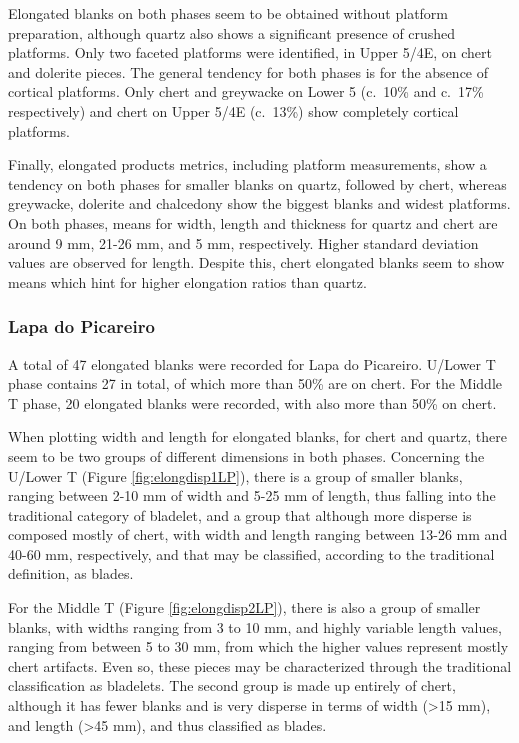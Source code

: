 \documentclass[12pt,twoside]{reedthesis}
\begin{document}
Elongated blanks on both phases seem to be obtained without platform preparation, although quartz also shows a significant presence of crushed platforms. Only two faceted platforms were identified, in Upper 5/4E, on chert and dolerite pieces. The general tendency for both phases is for the absence of cortical platforms. Only chert and greywacke on Lower 5 (c.~10\% and c.~17\% respectively) and chert on Upper 5/4E (c.~13\%) show completely cortical platforms.

Finally, elongated products metrics, including platform measurements, show a tendency on both phases for smaller blanks on quartz, followed by chert, whereas greywacke, dolerite and chalcedony show the biggest blanks and widest platforms. On both phases, means for width, length and thickness for quartz and chert are around 9 mm, 21-26 mm, and 5 mm, respectively. Higher standard deviation values are observed for length. Despite this, chert elongated blanks seem to show means which hint for higher elongation ratios than quartz.

\hypertarget{lapa-do-picareiro-6}{%
\subsubsection{Lapa do Picareiro}\label{lapa-do-picareiro-6}}

A total of 47 elongated blanks were recorded for Lapa do Picareiro. U/Lower T phase contains 27 in total, of which more than 50\% are on chert. For the Middle T phase, 20 elongated blanks were recorded, with also more than 50\% on chert.

When plotting width and length for elongated blanks, for chert and quartz, there seem to be two groups of different dimensions in both phases. Concerning the U/Lower T (Figure \ref{fig:elongdisp1LP}), there is a group of smaller blanks, ranging between 2-10 mm of width and 5-25 mm of length, thus falling into the traditional category of bladelet, and a group that although more disperse is composed mostly of chert, with width and length ranging between 13-26 mm and 40-60 mm, respectively, and that may be classified, according to the traditional definition, as blades.

For the Middle T (Figure \ref{fig:elongdisp2LP}), there is also a group of smaller blanks, with widths ranging from 3 to 10 mm, and highly variable length values, ranging from between 5 to 30 mm, from which the higher values represent mostly chert artifacts. Even so, these pieces may be characterized through the traditional classification as bladelets. The second group is made up entirely of chert, although it has fewer blanks and is very disperse in terms of width (\textgreater15 mm), and length (\textgreater45 mm), and thus classified as blades.
\end{document}
